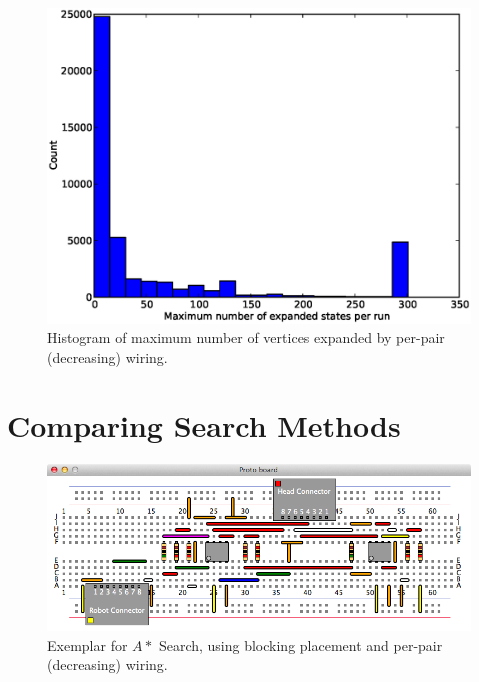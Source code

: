 \begin{figure}[H]
\begin{center}
\includegraphics[width=\textwidth]{Images/max_expanded_per_pair_decreasing.eps}
\caption[Number of vertices expanded by per-pair (decreasing)]{Histogram of
maximum number of vertices expanded by per-pair (decreasing) wiring.}
\label{fig:max_expanded_per_pair_decreasing}
\end{center}
\end{figure}

\section{Comparing Search Methods}

\begin{figure}[H]
\begin{center}
\includegraphics[width=\textwidth]{Images/exemplar_per_pair_decreasing.png}
\caption[$A*$ Search exemplar]{Exemplar for $A*$ Search, using blocking
placement and per-pair (decreasing) wiring.}
\end{center}
\end{figure}

